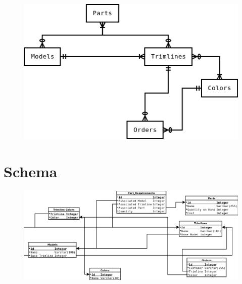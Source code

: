 \documentclass[11pt,letterpaper,oneside]{amsart}
\begin{document}
\begin{figure}[H]
	\centerline{\includegraphics[scale=1.2]{erddraft.png}}
\end{figure}

\section*{Schema}

\begin{figure}[H]
	\centerline{\includegraphics[scale=.6]{schema.png}}
\end{figure}
\end{document}
